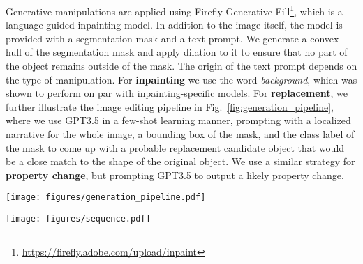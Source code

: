 \documentclass[10pt,twocolumn,letterpaper]{article}
\begin{document}
Generative manipulations are applied using Firefly Generative Fill\footnote{\url{https://firefly.adobe.com/upload/inpaint}}, which is a language-guided inpainting model. In addition to
the image itself, the model is provided with a segmentation mask and a text
prompt. We generate a convex hull of the segmentation mask and apply dilation to
it to ensure that no part of the object remains outside of the mask.
The origin of the text prompt depends on the type of manipulation. For
\textbf{inpainting} we use the word \textit{background}, which was shown to
perform on par with inpainting-specific models. For
\textbf{replacement}, we further illustrate the image editing pipeline in Fig.~\ref{fig:generation_pipeline}, where we use GPT3.5 in a few-shot learning manner, prompting
with a localized narrative for the whole image, a bounding box of the mask, and
the class label of the mask to come up with a probable replacement candidate
object that would be a close match to the shape of the original object. We use
a similar strategy for \textbf{property change}, but prompting GPT3.5 to
output a likely property change. 

\begin{figure*}[ht]
    \centering
    \texttt{[image: figures/generation\_pipeline.pdf]}
    \caption{METS image generation pipeline for generative manipulations. 
    The image, its localized narrative, object class name, and segmentation mask are sampled from the OpenImages dataset. 
    The localized narrative and class name are used to construct a prompt for GPT3.5, which outputs a likely replacement candidate object or a property change.
    The prompt templates are manipulation-type specific and can be seen in suppmat. 
    In the case of inpainting, the GPT3.5 block is omitted, and the prompt is simply \textit{background}. The pre-processing of the segmentation mask ensures that no part of the object remains outside of the mask.
    It involves generating a convex hull of the mask and applying dilation to it.
    The generative manipulation is then conditioned on the image, the mask, and the prompt and applied using Firefly Generative Fill.
}
    \label{fig:generation_pipeline}
\end{figure*}

\begin{figure*}[ht]
    \centering
    \texttt{[image: figures/sequence.pdf]}
    \caption{An example of a sequence of manipulations in METS. 
    The original image is shown in the first column, followed by the manipulated images. 
    The binary masks of the manipulated regions are superimposed on the images.
    The machine annotations generated during the sequence creation are shown in orange, while the human annotations are shown in blue.
    Note that only edit steps 5, 10, and 15 are shown, as these are the steps for which human annotations were collected. 
    All other data types are available for all steps.
    }
    \label{fig:sequence}
\end{figure*}
\end{document}
